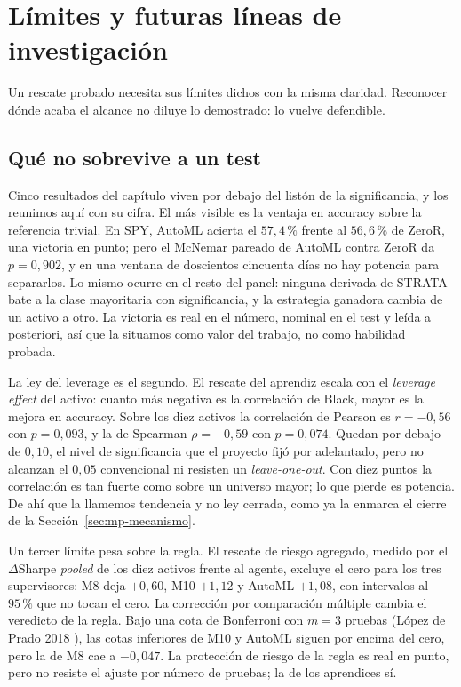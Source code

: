 \section{Límites y futuras líneas de investigación}
\label{sec:mp-limites}


Un rescate probado necesita sus límites dichos con la misma claridad. Reconocer dónde acaba el alcance no diluye lo demostrado: lo vuelve defendible.

\subsection{Qué no sobrevive a un test}
\label{sec:mp-lim-tests}

Cinco resultados del capítulo viven por debajo del listón de la significancia, y los reunimos aquí con su cifra. El más visible es la ventaja en accuracy sobre la referencia trivial. En SPY, AutoML acierta el $57{,}4\,\%$ frente al $56{,}6\,\%$ de ZeroR, una victoria en punto; pero el McNemar pareado de AutoML contra ZeroR da $p = 0{,}902$, y en una ventana de doscientos cincuenta días no hay potencia para separarlos. Lo mismo ocurre en el resto del panel: ninguna derivada de STRATA bate a la clase mayoritaria con significancia, y la estrategia ganadora cambia de un activo a otro. La victoria es real en el número, nominal en el test y leída a posteriori, así que la situamos como valor del trabajo, no como habilidad probada.

La ley del leverage es el segundo. El rescate del aprendiz escala con el \emph{leverage effect} del activo: cuanto más negativa es la correlación de Black, mayor es la mejora en accuracy. Sobre los diez activos la correlación de Pearson es $r = -0{,}56$ con $p = 0{,}093$, y la de Spearman $\rho = -0{,}59$ con $p = 0{,}074$. Quedan por debajo de $0{,}10$, el nivel de significancia que el proyecto fijó por adelantado, pero no alcanzan el $0{,}05$ convencional ni resisten un \emph{leave-one-out}. Con diez puntos la correlación es tan fuerte como sobre un universo mayor; lo que pierde es potencia. De ahí que la llamemos tendencia y no ley cerrada, como ya la enmarca el cierre de la Sección~\ref{sec:mp-mecanismo}.

Un tercer límite pesa sobre la regla. El rescate de riesgo agregado, medido por el $\Delta$Sharpe \emph{pooled} de los diez activos frente al agente, excluye el cero para los tres supervisores: M8 deja $+0{,}60$, M10 $+1{,}12$ y AutoML $+1{,}08$, con intervalos al $95\,\%$ que no tocan el cero. La corrección por comparación múltiple cambia el veredicto de la regla. Bajo una cota de Bonferroni con $m = 3$ pruebas (López de Prado 2018 \cite{lopezdeprado2018}), las cotas inferiores de M10 y AutoML siguen por encima del cero, pero la de M8 cae a $-0{,}047$. La protección de riesgo de la regla es real en punto, pero no resiste el ajuste por número de pruebas; la de los aprendices sí.

